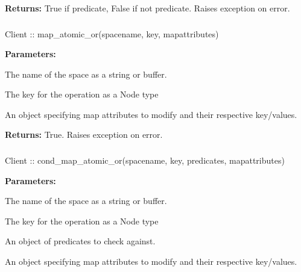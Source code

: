 \noindent\textbf{Returns:}
True if predicate, False if not predicate.  Raises exception on error.

\subsubsection{}
\label{api:nodejs:map_atomic_or}
\begin{javascriptcode}
Client :: map_atomic_or(spacename, key, mapattributes)
\end{javascriptcode}


\noindent\textbf{Parameters:}
\begin{description}[labelindent=\widthof{{\code{mapattributes}}},leftmargin=*,noitemsep,nolistsep,align=right]
\item[\code{spacename}] The name of the space as a string or buffer.
\item[\code{key}] The key for the operation as a Node type
\item[\code{mapattributes}] An object specifying map attributes to modify and their respective key/values.
\end{description}

\noindent\textbf{Returns:}
True.  Raises exception on error.

\subsubsection{}
\label{api:nodejs:cond_map_atomic_or}
\begin{javascriptcode}
Client :: cond_map_atomic_or(spacename, key, predicates, mapattributes)
\end{javascriptcode}


\noindent\textbf{Parameters:}
\begin{description}[labelindent=\widthof{{\code{mapattributes}}},leftmargin=*,noitemsep,nolistsep,align=right]
\item[\code{spacename}] The name of the space as a string or buffer.
\item[\code{key}] The key for the operation as a Node type
\item[\code{predicates}] An object of predicates to check against.
\item[\code{mapattributes}] An object specifying map attributes to modify and their respective key/values.
\end{description}


